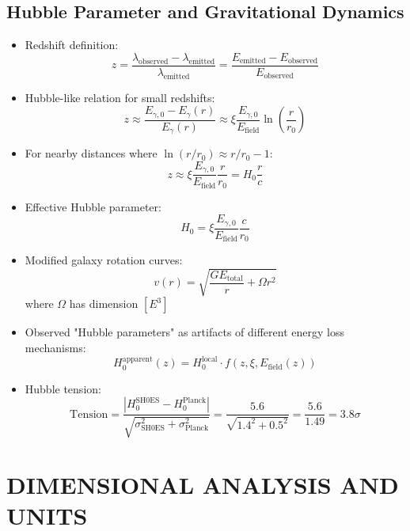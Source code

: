 \documentclass[12pt,a4paper]{article}
\begin{document}
	\subsection{Hubble Parameter and Gravitational Dynamics}
	\begin{itemize}
		\item Redshift definition:
		$$z = \frac{\lambda_{\text{observed}} - \lambda_{\text{emitted}}}{\lambda_{\text{emitted}}} = \frac{E_{\text{emitted}} - E_{\text{observed}}}{E_{\text{observed}}}$$
		
		\item Hubble-like relation for small redshifts:
		$$z \approx \frac{E_{\gamma,0} - E_\gamma(r)}{E_\gamma(r)} \approx \xi \frac{E_{\gamma,0}}{E_{\text{field}}} \ln\left(\frac{r}{r_0}\right)$$
		
		\item For nearby distances where $\ln(r/r_0) \approx r/r_0 - 1$:
		$$z \approx \xi \frac{E_{\gamma,0}}{E_{\text{field}}} \frac{r}{r_0} = H_0 \frac{r}{c}$$
		
		\item Effective Hubble parameter:
		$$H_0 = \xi \frac{E_{\gamma,0}}{E_{\text{field}}} \frac{c}{r_0}$$
		
		\item Modified galaxy rotation curves:
		$$v(r) = \sqrt{\frac{GE_{\text{total}}}{r} + \Omega r^2}$$
		where $\Omega$ has dimension $[E^3]$
		
		\item Observed "Hubble parameters" as artifacts of different energy loss mechanisms:
		$$H_0^{\text{apparent}}(z) = H_0^{\text{local}} \cdot f(z, \xi, E_{\text{field}}(z))$$
		
		\item Hubble tension:
		$$\text{Tension} = \frac{|H_0^{\text{SH0ES}} - H_0^{\text{Planck}}|}{\sqrt{\sigma_{\text{SH0ES}}^2 + \sigma_{\text{Planck}}^2}} = \frac{5.6}{\sqrt{1.4^2 + 0.5^2}} = \frac{5.6}{1.49} = 3.8\sigma$$
	\end{itemize}
	
	\section{DIMENSIONAL ANALYSIS AND UNITS}
	
\end{document}
